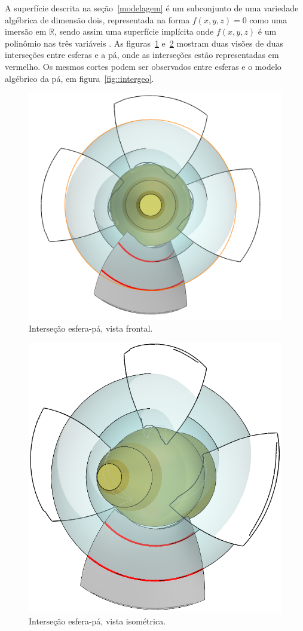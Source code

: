 A superfície descrita na seção~\ref{modelagem} é um subconjunto de uma
variedade algébrica de dimensão dois, representada na forma $f(x,y,z)=0$ como
uma imersão em $\mathbb{R}$, sendo assim uma superfície implícita onde
$f(x,y,z)$ é um polinômio nas três variáveis .
As
figuras~\ref{fig::interfrontal} e~\ref{fig::interiso} mostram duas visões de
duas interseções entre esferas e a pá, onde as interseções estão representadas
em vermelho. Os mesmos cortes podem ser observados entre esferas e o modelo
algébrico da pá, em figura~\ref{fig::intergeo}.


\begin{figure}[!ht]
	\centering
	\includegraphics[width=.7\columnwidth]{method/figs/planejamento/intersecao_frontal.PNG}
	\caption{Interseção esfera-pá, vista frontal.}
	\label{fig::interfrontal}
\end{figure}

\begin{figure}[!ht]
	\centering
	\includegraphics[width=.6\columnwidth]{method/figs/planejamento/intersecao_iso.PNG}
	\caption{Interseção esfera-pá, vista isométrica.}
	\label{fig::interiso}
\end{figure}

